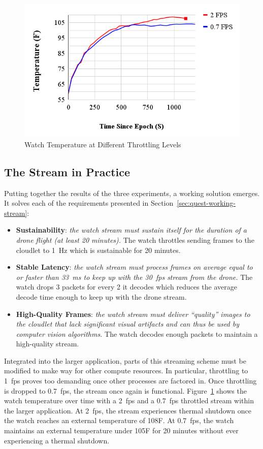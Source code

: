 \begin{figure}
    \centering
    \includegraphics[width=0.8\linewidth]{chapter3/FIGS/temperature.png}
    \caption{Watch Temperature at Different Throttling Levels}
    \label{fig:temperature}
\end{figure}

\subsection{The Stream in Practice}
Putting together the results of the three experiments, a working solution emerges. It solves each of the requirements presented in Section~\ref{sec:quest-working-stream}:
\begin{itemize}
    \item \textbf{Sustainability}: \textit{the watch stream must sustain itself for the duration of a drone flight (at least 20 minutes).}
    The watch throttles sending frames to the cloudlet to 1~Hz which is sustainable for 20 minutes.
    \item \textbf{Stable Latency}: \textit{the watch stream must process frames on average equal to or faster than 33~ms to keep up with the 30~fps stream from the drone.}
    The watch drops 3 packets for every 2 it decodes which reduces the average decode time enough to keep up with the drone stream.
    \item \textbf{High-Quality Frames}: \textit{the watch stream must deliver ``quality'' images to the cloudlet that lack significant visual artifacts and can thus be used by computer vision algorithms.}
    The watch decodes enough packets to maintain a high-quality stream.
\end{itemize}
Integrated into the larger application, parts of this streaming scheme must be modified to make way for other compute resources. In particular, throttling to 1~fps proves too demanding once other processes are factored in. Once throttling is dropped to 0.7~fps, the stream once again is functional. Figure~\ref{fig:temperature} shows the watch temperature over time with a 2~fps and a 0.7~fps throttled stream within the larger application. At 2~fps, the stream experiences thermal shutdown once the watch reaches an external temperature of 108\degree F. At 0.7~fps, the watch maintains an external temperature under 105\degree F for 20 minutes without ever experiencing a thermal shutdown.

